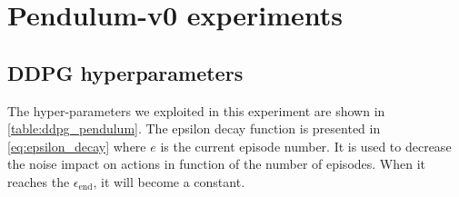 \section{Pendulum-v0 experiments} \label{sec:pendulum-exp}

\subsection{DDPG hyperparameters}

The hyper-parameters we exploited in this experiment are shown in \vref{table:ddpg_pendulum}.
The epsilon decay function is presented in \vref{eq:epsilon_decay} where $e$ is the current episode number.
It is used to decrease the noise impact on actions in function of the number of episodes.
When it reaches the $\epsilon_{\text{end}}$, it will become a constant.

